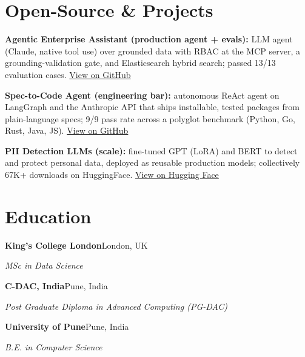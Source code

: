\documentclass[10pt,a4paper]{article}
\begin{document}
\section{Open-Source \& Projects}
\begin{tight}
  \item \textbf{Agentic Enterprise Assistant (production agent + evals):} LLM agent (Claude, native tool use) over grounded data with RBAC at the MCP server, a grounding-validation gate, and Elasticsearch hybrid search; passed 13/13 evaluation cases. \href{https://github.com/abhijeetscode/Agentic-Enterprise-Assistant}{View on GitHub}
  \item \textbf{Spec-to-Code Agent (engineering bar):} autonomous ReAct agent on LangGraph and the Anthropic API that ships installable, tested packages from plain-language specs; 9/9 pass rate across a polyglot benchmark (Python, Go, Rust, Java, JS). \href{https://github.com/abhijeetscode/Spec-to-Code-Agent}{View on GitHub}
  \item \textbf{PII Detection LLMs (scale):} fine-tuned GPT (LoRA) and BERT to detect and protect personal data, deployed as reusable production models; collectively 67K+ downloads on HuggingFace. \href{https://huggingface.co/ab-ai/pii_model}{View on Hugging Face}
\end{tight}

\section{Education}
{\color{company}\bfseries King's College London}\hfill {\color{muted}London, UK}\par
{\itshape MSc in Data Science}\par\vspace{2pt}
{\color{company}\bfseries C-DAC, India}\hfill {\color{muted}Pune, India}\par
{\itshape Post Graduate Diploma in Advanced Computing (PG-DAC)}\par\vspace{2pt}
{\color{company}\bfseries University of Pune}\hfill {\color{muted}Pune, India}\par
{\itshape B.E. in Computer Science}\par
\end{document}
